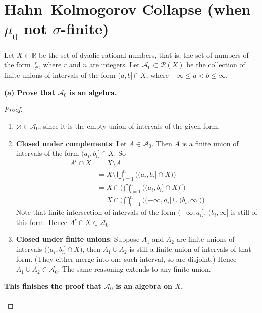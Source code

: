 \documentclass[lang=cn,11pt]{elegantbook}
\begin{document}
\section{Hahn–Kolmogorov Collapse (when $\mu_0$ not $\sigma$-finite)}
Let \(X \subset \mathbb{R}\) be the set of dyadic rational numbers, that is, the set of numbers of the form \(\frac{r}{2^n}\), where \(r\) and \(n\) are integers. Let \(\mathcal{A}_0 \subset \mathcal{P}(X)\) be the collection of finite unions of intervals of the form \((a, b] \cap X\), where \(-\infty \leq a < b \leq \infty\).

\noindent \textbf{(a) Prove that \(\mathcal{A}_0\) is an algebra.}
\begin{proof}
\begin{enumerate}
    \item \(\varnothing \in \mathcal{A}_0\), since it is the empty union of intervals of the given form.
    \item \textbf{Closed under complements}:  Let \(A\in \mathcal{A}_0\). Then \(A\) is a finite union of intervals of the form \((a_i,b_i]\cap X\).  So  \begin{align}
     A^c \cap X  &= X\setminus A \\
     &=  X\setminus \bigcup_{i=1}^n \bigl((a_i,b_i]\cap X\bigr) \bigr) \\
     &=
 X\cap \bigl(\bigcap_{i=1}^n \bigl((a_i,b_i]\cap X\bigr)^c \bigr) \\
    &  =  X\cap \bigl(\bigcap_{i=1}^n \bigl((-\infty, a_i] \cup (b_i, \infty]\bigr) \bigr)
\end{align} 
Note that finite intersection of intervals of the form \((-\infty,a_i]\), \((b_i,\infty]\) is still of this form. Hence \(A^c\cap X\in \mathcal{A}_0\).
    \item \textbf{Closed under finite unions}: Suppose \(A_1\) and \(A_2\) are finite unions of intervals \(\bigl((a_i,b_i]\cap X\bigr)\), then \(A_1\cup A_2\) is still a finite union of intervals of that form. (They either merge into one such interval, so are disjoint.) Hence \(A_1\cup A_2\in \mathcal{A}_0\).  The same reasoning extends to any finite union.
\end{enumerate}
\noindent \textbf{This finishes the proof that \(\mathcal{A}_0\) is an algebra on \(X\).}\\\\
\end{proof}
\end{document}
